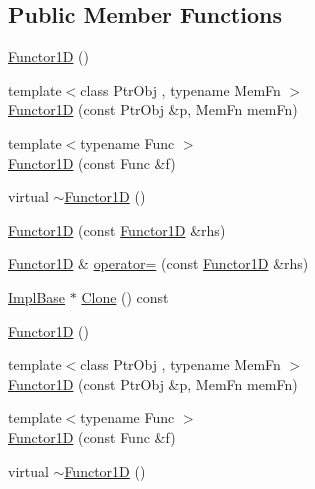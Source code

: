 \subsection*{Public Member Functions}
\begin{DoxyCompactItemize}
\item 
\mbox{\hyperlink{classROOT_1_1Math_1_1Functor1D_ad3e410215d5ac30310dedb841bf6a88f}{Functor1D}} ()
\item 
{\footnotesize template$<$class Ptr\+Obj , typename Mem\+Fn $>$ }\\\mbox{\hyperlink{classROOT_1_1Math_1_1Functor1D_a6aee539fa2657228e99a1fc542f9ff9e}{Functor1D}} (const Ptr\+Obj \&p, Mem\+Fn mem\+Fn)
\item 
{\footnotesize template$<$typename Func $>$ }\\\mbox{\hyperlink{classROOT_1_1Math_1_1Functor1D_ac200eefbe8571f022f6b6a5d79fc7855}{Functor1D}} (const Func \&f)
\item 
virtual \mbox{\hyperlink{classROOT_1_1Math_1_1Functor1D_a270ac3bfa816f778226caad0e6731a5f}{$\sim$\+Functor1D}} ()
\item 
\mbox{\hyperlink{classROOT_1_1Math_1_1Functor1D_a3323053da6385e3168b80163b266c600}{Functor1D}} (const \mbox{\hyperlink{classROOT_1_1Math_1_1Functor1D}{Functor1D}} \&rhs)
\item 
\mbox{\hyperlink{classROOT_1_1Math_1_1Functor1D}{Functor1D}} \& \mbox{\hyperlink{classROOT_1_1Math_1_1Functor1D_a723dff64cd3d4e53174624fa56f30a18}{operator=}} (const \mbox{\hyperlink{classROOT_1_1Math_1_1Functor1D}{Functor1D}} \&rhs)
\item 
\mbox{\hyperlink{classROOT_1_1Math_1_1Functor1D_a1ade2017edb7db0cbaf9a27a864f4dd3}{Impl\+Base}} $\ast$ \mbox{\hyperlink{classROOT_1_1Math_1_1Functor1D_af77ece084fc56e41c06e32e0f78a88a9}{Clone}} () const
\item 
\mbox{\hyperlink{classROOT_1_1Math_1_1Functor1D_ad3e410215d5ac30310dedb841bf6a88f}{Functor1D}} ()
\item 
{\footnotesize template$<$class Ptr\+Obj , typename Mem\+Fn $>$ }\\\mbox{\hyperlink{classROOT_1_1Math_1_1Functor1D_a6aee539fa2657228e99a1fc542f9ff9e}{Functor1D}} (const Ptr\+Obj \&p, Mem\+Fn mem\+Fn)
\item 
{\footnotesize template$<$typename Func $>$ }\\\mbox{\hyperlink{classROOT_1_1Math_1_1Functor1D_ac200eefbe8571f022f6b6a5d79fc7855}{Functor1D}} (const Func \&f)
\item 
virtual \mbox{\hyperlink{classROOT_1_1Math_1_1Functor1D_a270ac3bfa816f778226caad0e6731a5f}{$\sim$\+Functor1D}} ()

\end{DoxyCompactItemize}
